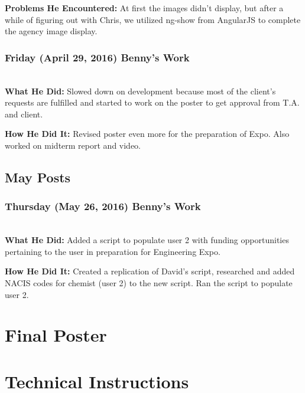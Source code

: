 \documentclass[onecolumn]{IEEEtran}
\begin{document}
	\textbf{Problems He Encountered: }
	At first the images didn't display, but after a while of figuring out with Chris, we utilized ng-show from AngularJS to complete the agency image display. 

\subsubsection{Friday (April 29, 2016) Benny's Work  } \hspace*{\fill} \\
    \textbf{What He Did: } 
    Slowed down on development because most of the client's requests are fulfilled and started to work on the poster to get approval from T.A. and client. 
    
	\textbf{How He Did It: }
	Revised poster even more for the preparation of Expo. Also worked on midterm report and video. 

\subsection{May Posts}
\subsubsection{Thursday (May 26, 2016) Benny's Work  } \hspace*{\fill} \\
    \textbf{What He Did: } 
    Added a script to populate user 2 with funding opportunities pertaining to the user in preparation for Engineering Expo. 
    
	\textbf{How He Did It: }
	Created a replication of David's script, researched and added NACIS codes for chemist (user 2) to the new script. Ran the script to populate user 2. 

\section{Final Poster}
\clearpage
\addtocounter{page}{1} %

\section{Technical Instructions}
\end{document}
